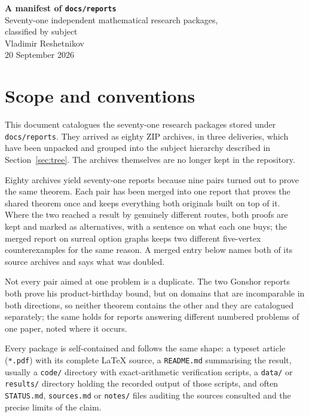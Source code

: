 \documentclass[11pt]{article}
\newcommand{\dir}[1]{\texttt{#1}}
\begin{document}
\begin{center}
  {\LARGE\bfseries\color{Ink} A manifest of \texttt{docs/reports}}\\[0.6em]
  {\large Seventy-one independent mathematical research packages,\\
   classified by subject}\\[1.0em]
  {\normalsize Vladimir Reshetnikov}\\[0.3em]
  {\normalsize 20 September 2026}
\end{center}

\vspace{0.8em}

\section{Scope and conventions}

This document catalogues the seventy-one research packages stored under
\dir{docs/reports}.  They arrived as eighty ZIP archives, in three deliveries,
which have been unpacked and grouped into the subject hierarchy described in
Section~\ref{sec:tree}.  The archives themselves are no longer kept in the
repository.

Eighty archives yield seventy-one reports because nine pairs turned out to prove
the same theorem.  Each pair has been merged into one report that proves the
shared theorem once and keeps everything both originals built on top of it.
Where the two reached a result by genuinely different routes, both proofs are
kept and marked as alternatives, with a sentence on what each one buys; the
merged report on surreal option graphs keeps two different five-vertex
counterexamples for the same reason.  A merged entry below names both of its
source archives and says what was doubled.

Not every pair aimed at one problem is a duplicate.  The two Gonshor
reports both prove his product-birthday bound, but on domains that are
incomparable in both directions, so neither theorem contains the other and they
are catalogued separately; the same holds for reports answering different numbered problems of
one paper, noted where it occurs.

Every package is self-contained and follows the same shape: a typeset article
(\texttt{*.pdf}) with its complete \LaTeX{} source, a \texttt{README.md}
summarising the result, usually a \texttt{code/} directory with exact-arithmetic
verification scripts, a \texttt{data/} or \texttt{results/} directory holding the
recorded output of those scripts, and often \texttt{STATUS.md},
\texttt{sources.md} or \texttt{notes/} files auditing the sources consulted and
the precise limits of the claim.
\end{document}
